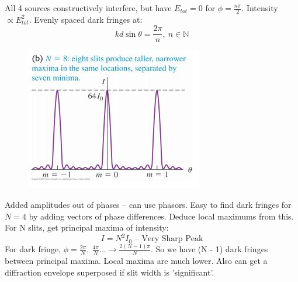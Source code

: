 \documentclass[a4paper, 11pt, normalem]{report}
\begin{document}
All 4 sources constructively interfere, but have $E_{tot} = 0$ for $\phi = \frac{n\pi}{2}$.
Intensity $\propto E_{tot}^{2}$.
Evenly spaced dark fringes at:
\begin{equation}
    kd\sin{\theta} = \frac{2\pi}{n},~n \in \mathbb{N}
\end{equation}
\begin{figure}[H]
    \centering
    \includegraphics{Intense.jpg}
\end{figure}
Added amplitudes out of phases -- can use phasors.
Easy to find dark fringes for $N = 4$ by adding vectors of phase differences.
Deduce local maximums from this.
For N slits, get principal maxima of intensity:
\begin{equation}
    I = N^{2}I_{0}\text{ -- Very Sharp Peak}
\end{equation}
For dark fringe, $\phi = \frac{2\pi}{N},~\frac{4\pi}{N} ...\rightarrow \frac{2(N - 1)\pi}{N}$.
So we have (N - 1) dark fringes between principal maxima.
Local maxima are much lower.
Also can get a diffraction envelope superposed if slit width is 'significant'.
\end{document}
